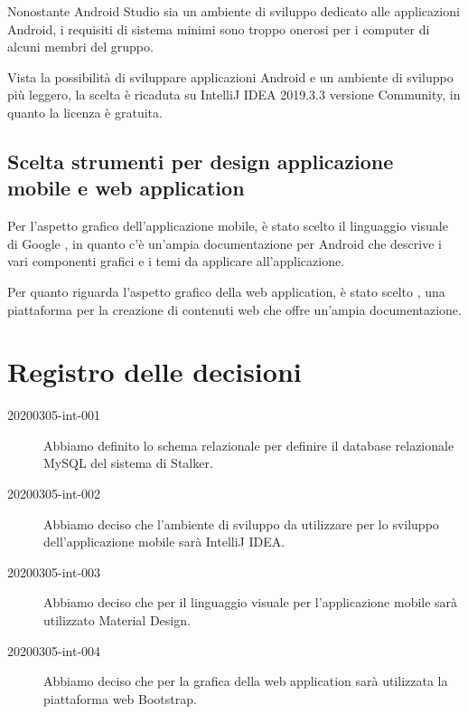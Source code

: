 \documentclass{article}
\begin{document}
Nonostante Android Studio sia un ambiente di sviluppo dedicato alle applicazioni Android, i requisiti di sistema minimi sono troppo onerosi per i computer di alcuni membri del gruppo.

Vista la possibilità di sviluppare applicazioni Android e un ambiente di sviluppo più leggero, la scelta è ricaduta su IntelliJ IDEA 2019.3.3 versione Community, in quanto la licenza è gratuita.

\subsection{Scelta strumenti per design applicazione mobile e web application}%
\label{sub:scelta_strumenti_per_design_applicazione_mobile_e_web_application}
Per l'aspetto grafico dell'applicazione mobile, è stato scelto il linguaggio visuale di Google , in quanto c'è un'ampia documentazione per Android che descrive i vari componenti grafici e i temi da applicare all'applicazione.

Per quanto riguarda l'aspetto grafico della web application, è stato scelto , una piattaforma per la creazione di contenuti web che offre un'ampia documentazione.



\newpage
\section{Registro delle decisioni}%
\label{sec:registro_delle_decisioni}

\begin{description}
  \item[20200305-int-001] Abbiamo definito lo schema relazionale per definire il database relazionale MySQL del sistema di Stalker.
  \item[20200305-int-002] Abbiamo deciso che l'ambiente di sviluppo da utilizzare per lo sviluppo dell'applicazione mobile sarà IntelliJ IDEA\@.
  \item[20200305-int-003] Abbiamo deciso che per il linguaggio visuale per l'applicazione mobile sarà utilizzato Material Design.
  \item[20200305-int-004] Abbiamo deciso che per la grafica della web application sarà utilizzata la piattaforma web Bootstrap.
\end{description}

\end{document}
